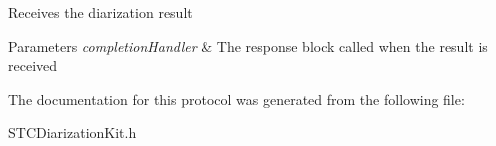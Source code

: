 Receives the diarization result 
\begin{DoxyParams}{Parameters}
{\em completion\+Handler} & The response block called when the result is received \\
\hline
\end{DoxyParams}


The documentation for this protocol was generated from the following file\+:\begin{DoxyCompactItemize}
\item 
S\+T\+C\+Diarization\+Kit.\+h\end{DoxyCompactItemize}
